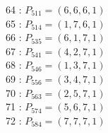 \documentclass{article}
\begin{document}
{\begin{multicols}{3}
64 : $P_{511}=( 6, 6, 6, 1 )$\\
65 : $P_{514}=( 1, 7, 6, 1 )$\\
66 : $P_{535}=( 6, 1, 7, 1 )$\\
67 : $P_{541}=( 4, 2, 7, 1 )$\\
68 : $P_{546}=( 1, 3, 7, 1 )$\\
69 : $P_{556}=( 3, 4, 7, 1 )$\\
70 : $P_{563}=( 2, 5, 7, 1 )$\\
71 : $P_{574}=( 5, 6, 7, 1 )$\\
72 : $P_{584}=( 7, 7, 7, 1 )$\\
\end{multicols}


%


%


}%
\end{document}
